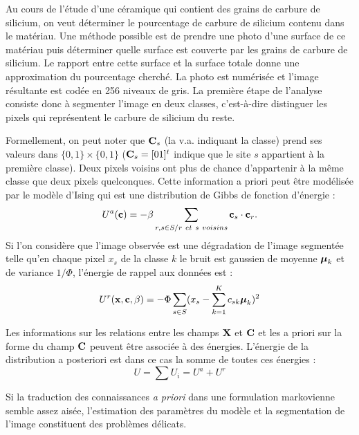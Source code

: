 \begin{ex}\label{ex:modele}
Au cours de l'\'etude d'une c\'eramique qui contient des grains de 
carbure de silicium, on veut d\'eterminer le pourcentage de carbure
de silicium contenu dans le mat\'eriau.
Une m\'ethode possible est de prendre une photo d'une surface de ce 
mat\'eriau puis d\'eterminer quelle surface est couverte par les
grains de carbure de silicium. Le rapport entre cette surface et
la surface totale donne une approximation du pourcentage cherch\'e.
La photo est num\'eris\'ee et l'image r\'esultante est cod\'ee en 256
niveaux de gris. La premi\`ere \'etape de l'analyse consiste donc \`a
segmenter l'image en deux classes, c'est-\`a-dire distinguer les pixels
qui repr\'esentent le carbure de silicium du  reste. 

Formellement, on peut noter que  $\mbox{\bf C}_s$ (la v.a. indiquant la classe)
prend ses valeurs dans $\{0,1\}\times \{0,1\}$ ($\mbox{\bf C}_s=[0 1]^t$ indique que le site
$s$ appartient \`a la premi\`ere classe).
Deux pixels voisins ont plus de chance d'appartenir  \`a la m\^eme
classe que deux pixels quelconques. Cette information a priori peut
\^etre mod\'elis\'ee par le mod\`ele d'Ising qui est une distribution 
de Gibbs de fonction d'\'energie :
\begin{equation}
U^a(\bc)= - \beta \sum_{r,s \in S/ r \ et \ s \ voisins} \bc_s \cdot \bc_r.
\end{equation}
Si l'on consid\`ere que l'image observ\'ee est une d\'egradation de
l'image segment\'ee telle qu'en chaque pixel $x_s$ de la classe $k$ le bruit 
est  gaussien de moyenne $\mbox{\boldmath $\mu$}_k$ et de variance $1/\Phi$, l'\'energie
de rappel aux donn\'ees est :
\begin{equation}
U^r(\mbox{\bf x},\mbox{\bf c},\beta)=-\Phi \sum_{s \in S} (x_s - \sum_{k=1}^K c_{sk} \mbox{\boldmath $\mu$}_k)^2
\end{equation}
\end{ex}
 

Les informations sur les relations entre les champs  $\mbox{\bf X}$ et $\mbox{\bf C}$ 
et les a priori sur la forme du champ $\mbox{\bf C}$ peuvent 
 \^etre associ\'ee \`a des \'energies.
L'\'energie de la distribution a posteriori est dans ce cas la somme
de toutes ces \'energies :
\begin{equation}
U=\sum  U_i= U^a + U^r
\end{equation}


Si la traduction des connaissances {\em a priori} dans une
formulation markovienne semble assez ais\'ee, l'estimation
des param\`etres du mod\`ele et la segmentation de l'image
constituent des probl\`emes d\'elicats.


